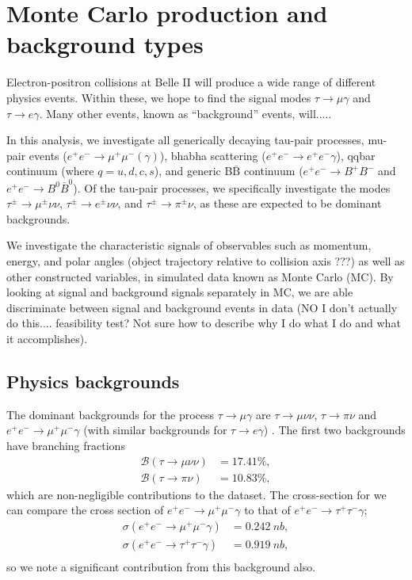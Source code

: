 \documentclass[12pt]{thesis}  %
\newcommand{\br}{\mathcal{B}}
\newcommand{\tmg}{\tau\to\mu\gamma}
\begin{document}
\chapter{Monte Carlo production and background types}

Electron-positron collisions at Belle II will produce a wide range of different physics events. Within these, we hope to find the signal modes $\tau\to\mu\gamma$ and $\tau\to e\gamma$. Many other events, known as ``background'' events, will.....

In this analysis, we investigate all generically decaying tau-pair processes, mu-pair events ($e^+ e^- \to \mu^+ \mu^- (\gamma)$), bhabha scattering ($e^+ e^- \to e^+ e^- \gamma$), qqbar continuum (where $q = u, d, c, s$), and generic B$\bar{\text{B}}$ continuum ($e^+ e^- \to B^+ B^-$ and $e^+ e^- \to B^0 \bar{B}^0$). Of the tau-pair processes, we specifically investigate the modes $\tau^{\pm} \to \mu^{\pm} \nu \nu$, $\tau^{\pm} \to e^{\pm} \nu \nu$, and $\tau^{\pm} \to \pi^{\pm} \nu$, as these are expected to be dominant backgrounds.

We investigate the characteristic signals of observables such as momentum, energy, and polar angles (object trajectory relative to collision axis ???) as well as other constructed variables, in simulated data known as Monte Carlo (MC). By looking at signal and background signals separately in MC, we are able discriminate between signal and background events in data (NO I don't actually do this.... feasibility test? Not sure how to describe why I do what I do and what it accomplishes).

\section{Physics backgrounds}

The dominant backgrounds for the process $\tmg$ are $\tau\to \mu \nu \nu$, $\tau\to \pi \nu$ and $e^+ e^- \to \mu^+ \mu^- \gamma$ (with similar backgrounds for $\tau\to e \gamma$) \cite{Hayasaka:2007}. The first two backgrounds have branching fractions
\begin{align*}
\br(\tau\to \mu \nu \nu)&=\num{17.41}{\percent},\\
\br(\tau\to\pi\nu)&=\num{10.83}{\percent},
\end{align*}
which are non-negligible contributions to the dataset. The cross-section for we can compare the cross section of $e^+ e^- \to \mu^+ \mu^- \gamma$ to that of $e^+ e^- \to \tau^+ \tau^- \gamma$;
\begin{align*}
\sigma(e^+ e^- \to \mu^+ \mu^- \gamma)&=\SI{0.242}{nb},\\
\sigma(e^+ e^- \to \tau^+ \tau^- \gamma)&=\SI{0.919}{nb},\\
\end{align*}
so we note a significant contribution from this background also.
\end{document}
